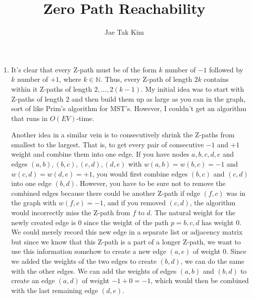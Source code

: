 \documentclass[11pt]{article}
\title{Zero Path Reachability}
\author{Jae Tak Kim}
\date{}
\theoremstyle{remark}
\theoremstyle{remark}
\begin{document}
\maketitle

\begin{enumerate}
    \item It's clear that every Z-path must be of the form $k$ number of $-1$ followed by $k$ number of $+1$, where $k\in\mathbb{N}$. Thus, every Z-path of length $2k$ contains within it Z-paths of length $2,\ldots,2(k-1)$. My initial idea was to start with Z-paths of length 2 and then build them up as large as you can in the graph, sort of like Prim's algorithm for MST's. However, I couldn't get an algorithm that runs in $O(EV)$-time.

    Another idea in a similar vein is to consecutively shrink the Z-paths from smallest to the largest. That is, to get every pair of consecutive $-1$ and $+1$ weight and combine them into one edge. If you have nodes $a,b,c,d,e$ and edges $(a,b), (b,c), (c,d), (d,e)$ with $w(a,b)=w(b,c)=-1$ and $w(c,d)=w(d,e)=+1$, you would first combine edges $(b,c)$ and $(c,d)$ into one edge $(b,d)$. However, you have to be sure not to remove the combined edges because there could be another Z-path if edge $(f,c)$ was in the graph with $w(f,c)=-1$, and if you removed $(c,d)$, the algorithm would incorrectly miss the Z-path from $f$ to $d$. The natural weight for the newly created edge is 0 since the weight of the path $p=b,c,d$ has weight 0. We could merely record this new edge in a separate list or adjacency matrix but since we know that this Z-path is a part of a longer Z-path, we want to use this information somehow to create a new edge $(a,e)$ of weight 0. Since we added the weights of the two edges to create $(b,d)$, we can do the same with the other edges. We can add the weights of edges $(a,b)$ and $(b,d)$ to create an edge $(a,d)$ of weight $-1+0=-1$, which would then be combined with the last remaining edge $(d,e)$.


\end{enumerate}
\end{document}
